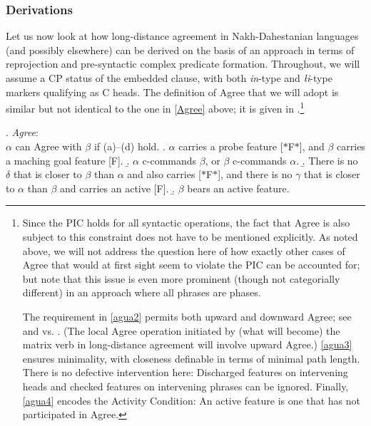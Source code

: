\documentclass[output=paper
,modfonts
,nonflat]{langsci/langscibook}
\begin{document}
\subsubsection{Derivations}

Let us now look at how long-distance agreement in Nakh-Dahestanian
languages (and possibly elsewhere) can be derived on the basis of an
approach in terms of reprojection and pre-syntactic complex predicate
formation. Throughout, we will assume a CP status of the embedded
clause, with both  {\it \textcrlambda in}-type and {\it {\l}i}-type
markers qualifying as C heads. The definition of Agree that we will
adopt is similar but not identical to the one in \ref{Agree} above; it
is given in \Next.\footnote{Since the PIC holds for all syntactic
  operations, the fact that Agree is also subject to this constraint
  does not have to be mentioned explicitly. As noted above, we will
  not address the question here of how exactly other cases of Agree that
  would at first sight seem to violate the PIC can be accounted for;
  but note that this issue is even more prominent (though not
  categorially different) in an approach where all phrases are
  phases. 

The requirement in \ref{agua2} permits both upward and downward Agree; see
\cite{Zeijlstra:12} and \cite{Bjorkman&Zeijlstra:14} vs. \cite{Preminger:13:tha}.
(The local Agree operation initiated by (what will become) the matrix verb in
long-distance agreement will involve upward Agree.) \ref{agua3}
ensures minimality, with closeness definable in terms of minimal path
length. There is no defective intervention here: Discharged
features on intervening  heads and checked features on intervening phrases can be ignored. Finally,
\ref{agua4} encodes the Activity Condition: An active feature is one
that has not participated in Agree.}

\Lsciex. {\it Agree}:\\
$\alpha$ can Agree with $\beta$ if (a)--(d) hold.
\a. $\alpha$ carries a probe feature [$*$F$*$], and $\beta$ carries a
maching goal feature [F].
\b. $\alpha$ \label{agua2}c-commands $\beta$, or $\beta$ c-commands $\alpha$.
\b. There is \label{agua3}no $\delta$ that is closer to $\beta$ than $\alpha$ and
also carries [$*$F$*$], and there is no $\gamma$ that is closer to
$\alpha$ than $\beta$ and carries an active [F].
\b. $\beta$ bears an \label{agua4}active feature. 
\end{document}
